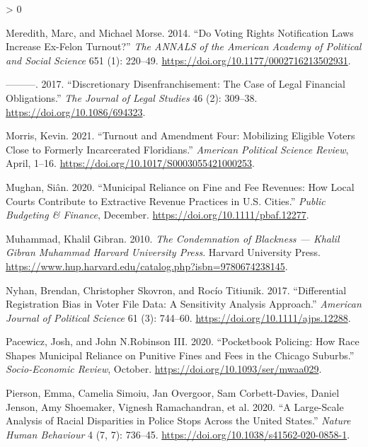 \documentclass[
  12pt,
]{article}
\newlength{\cslhangindent}
\newenvironment{CSLReferences}[2] %
 {%
  \setlength{\parindent}{0pt}
  \ifodd #1 \everypar{\setlength{\hangindent}{\cslhangindent}}\ignorespaces\fi
  \ifnum #2 > 0
  \setlength{\parskip}{#2\baselineskip}
  \fi
 }%
 {}
\begin{document}
\begin{CSLReferences}{1}{0}
\leavevmode\hypertarget{ref-Meredith2014}{}%
Meredith, Marc, and Michael Morse. 2014. {``Do {Voting Rights Notification Laws Increase Ex}-{Felon Turnout}?''} \emph{The ANNALS of the American Academy of Political and Social Science} 651 (1): 220--49. \url{https://doi.org/10.1177/0002716213502931}.

\leavevmode\hypertarget{ref-Meredith2017}{}%
---------. 2017. {``Discretionary {Disenfranchisement}: {The Case} of {Legal Financial Obligations}.''} \emph{The Journal of Legal Studies} 46 (2): 309--38. \url{https://doi.org/10.1086/694323}.

\leavevmode\hypertarget{ref-Morris2021}{}%
Morris, Kevin. 2021. {``Turnout and {Amendment Four}: {Mobilizing Eligible Voters Close} to {Formerly Incarcerated Floridians}.''} \emph{American Political Science Review}, April, 1--16. \url{https://doi.org/10.1017/S0003055421000253}.

\leavevmode\hypertarget{ref-Mughan2020}{}%
Mughan, Siân. 2020. {``Municipal {Reliance} on {Fine} and {Fee Revenues}: {How Local Courts Contribute} to {Extractive Revenue Practices} in {U}.{S}. {Cities}.''} \emph{Public Budgeting \& Finance}, December. \url{https://doi.org/10.1111/pbaf.12277}.

\leavevmode\hypertarget{ref-Muhammad2010}{}%
Muhammad, Khalil Gibran. 2010. \emph{The {Condemnation} of {Blackness} --- {Khalil Gibran Muhammad} \textbar{} {Harvard University Press}}. {Harvard University Press}. \url{https://www.hup.harvard.edu/catalog.php?isbn=9780674238145}.

\leavevmode\hypertarget{ref-Nyhan2017}{}%
Nyhan, Brendan, Christopher Skovron, and Rocío Titiunik. 2017. {``Differential {Registration Bias} in {Voter File Data}: {A Sensitivity Analysis Approach}.''} \emph{American Journal of Political Science} 61 (3): 744--60. \url{https://doi.org/10.1111/ajps.12288}.

\leavevmode\hypertarget{ref-Pacewicz2020}{}%
Pacewicz, Josh, and John N.Robinson III. 2020. {``Pocketbook Policing: {How} Race Shapes Municipal Reliance on Punitive Fines and Fees in the {Chicago} Suburbs.''} \emph{Socio-Economic Review}, October. \url{https://doi.org/10.1093/ser/mwaa029}.

\leavevmode\hypertarget{ref-Pierson2020}{}%
Pierson, Emma, Camelia Simoiu, Jan Overgoor, Sam Corbett-Davies, Daniel Jenson, Amy Shoemaker, Vignesh Ramachandran, et al. 2020. {``A Large-Scale Analysis of Racial Disparities in Police Stops Across the {United States}.''} \emph{Nature Human Behaviour} 4 (7, 7): 736--45. \url{https://doi.org/10.1038/s41562-020-0858-1}.


\end{CSLReferences}
\end{document}

